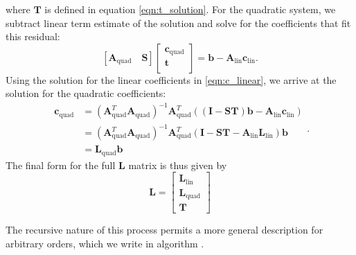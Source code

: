 where $\mathbf{T}$ is defined in equation \ref{eqn:t_solution}. For the quadratic system, we subtract linear term estimate of the solution and solve for the coefficients that fit this residual:
\begin{equation}
\label{eqn:fitting_quadratic}
\left[
\mathbf{A}_{\text{quad}} \quad \mathbf{S}
\right]
\left[ \begin{array}{c}
\mathbf{c}_{\text{quad}} \\
\mathbf{t} \\
\end{array} \right] = \mathbf{b} - \mathbf{A}_{\text{lin}}\mathbf{c}_{\text{lin}}
\text{.}
\end{equation}
Using the solution for the linear coefficients in \ref{eqn:c_linear}, we arrive at the solution for the quadratic coefficients:
\begin{equation}
\label{eqn:c_quad}
\begin{split}
\mathbf{c}_{\text{quad}} & = (\mathbf{A}_{\text{quad}}^T\mathbf{A}_{\text{quad}})^{-1}\mathbf{A}_{\text{quad}}^T((\mathbf{I-ST})\mathbf{b} - \mathbf{A}_{\text{lin}}\mathbf{c}_{\text{lin}}) \\
		   & = (\mathbf{A}_{\text{quad}}^T\mathbf{A}_{\text{quad}})^{-1}\mathbf{A}_{\text{quad}}^T(\mathbf{I-ST} - \mathbf{A}_{\text{lin}}\mathbf{L}_{\text{lin}})\mathbf{b} \\
           & = \mathbf{L}_{\text{quad}}\mathbf{b}
\end{split}
\text{.}
\end{equation}
The final form for the full $\mathbf{L}$ matrix is thus given by
\begin{equation}
\mathbf{L} =
\begin{bmatrix}
\mathbf{L}_{\text{lin}} \\
\mathbf{L}_{\text{quad}} \\
\mathbf{T}
\end{bmatrix}
\end{equation}

The recursive nature of this process permits a more general description for arbitrary orders, which we write in algorithm .

